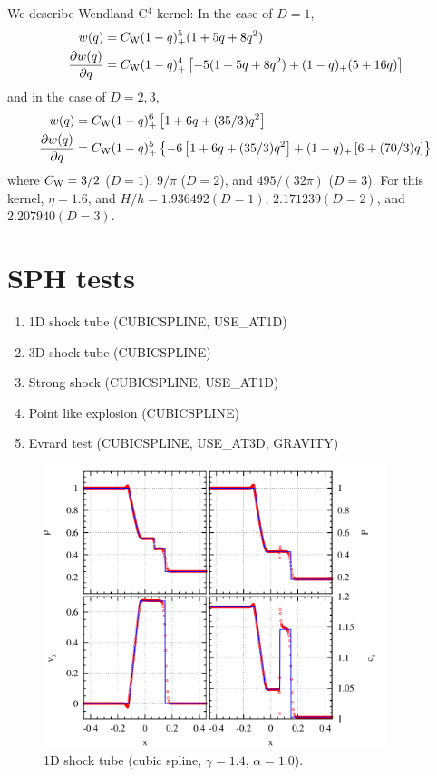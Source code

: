 \documentclass[fleqn,dvipdfmx]{article}
\begin{document}
We describe Wendland C$^4$ kernel: In the case of $D = 1$,
\begin{align}
  w(q) &= C_{\rm W} (1-q)_+^5 (1+5q+8q^2) \\
  \frac{\partial w(q)}{\partial q} &= C_{\rm W} (1-q)_+^4 \left[
    -5(1+5q+8q^2) + (1-q)_+ (5+16q) \right]
\end{align}
and in the case of $D = 2, 3$,
\begin{align}
  w(q) &= C_{\rm W} (1-q)_+^6 \left[ 1+6q+(35/3)q^2 \right] \\
  \frac{\partial w(q)}{\partial q} &= C_{\rm W} (1-q)_+^5 \left\{-6
  \left[ 1+6q+(35/3)q^2 \right] + (1-q)_+ \left[ 6+(70/3)q \right]
  \right\}
\end{align}
where $C_{\rm W}=3/2$ ($D=1$), $9/\pi$ ($D=2$), and $495/(32\pi)$
($D=3$). For this kernel, $\eta=1.6$, and $H/h=1.936492(D=1)$,
$2.171239(D=2)$, and $2.207940(D=3)$.

\section{SPH tests}

\begin{enumerate}
\item 1D shock tube (CUBICSPLINE, USE\_AT1D)
\item 3D shock tube (CUBICSPLINE)
\item Strong shock (CUBICSPLINE, USE\_AT1D)
\item Point like explosion (CUBICSPLINE)
\item Evrard test (CUBICSPLINE, USE\_AT3D, GRAVITY)
\end{enumerate}

\begin{figure}
  \begin{center}
    \includegraphics[width=10cm,bb=0 0 1020 840]{fig/shock_1d/draw.png}
  \end{center}
  \caption{1D shock tube (cubic spline, $\gamma=1.4$, $\alpha=1.0$).}
\end{figure}
\end{document}
